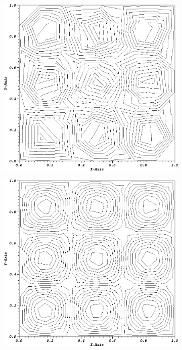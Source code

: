 \begin{figure}
{\begin{subfigure}[b]{0.45\textwidth}
	\end{subfigure}
}
\vspace{2.5mm}
{
	\begin{subfigure}[b]{0.45\textwidth}
		\centering
		\label{subfig::SineMMS_SqPolyn64_PWL1}
		\includegraphics[width=\textwidth]{figures/sec_BF/MMSSine_PWLD1_SQPMesh_n64.png}
	\end{subfigure}
	\hfill
	\begin{subfigure}[b]{0.45\textwidth}
		\centering
		\label{subfig::SineMMS_SqPolyn256_PWL1}
		\includegraphics[width=\textwidth]{figures/sec_BF/MMSSine_PWLD1_SQPMesh_n256.png}

\end{subfigure}}
\end{figure}
